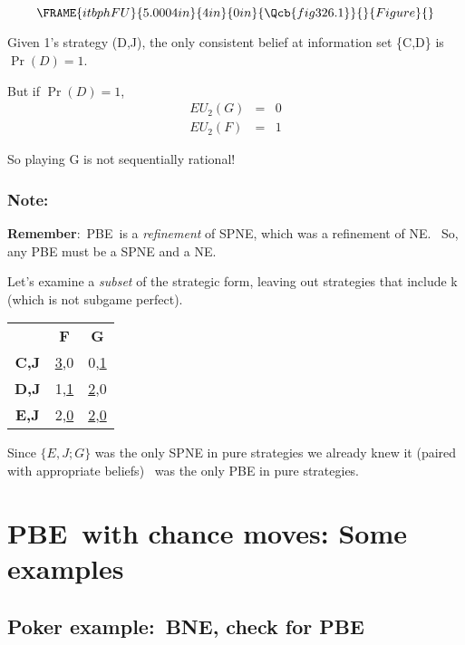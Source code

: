 \documentclass{article}
\begin{document}
\[
\FRAME{itbphFU}{5.0004in}{4in}{0in}{\Qcb{fig 326.1}}{}{Figure}{\special%
{language "Scientific Word";type "GRAPHIC";maintain-aspect-ratio
TRUE;display "USEDEF";valid_file "T";width 5.0004in;height 4in;depth
0in;original-width 5.3358in;original-height 4.6484in;cropleft "0";croptop
"1";cropright "1";cropbottom "0";tempfilename
'JSH9C621.wmf';tempfile-properties "XPR";}} 
\]

Given 1's strategy (D,J), the only consistent belief at information set
\{C,D\} is $\Pr (D)=1$.

But if $\Pr (D)=1$, 
\begin{eqnarray*}
EU_{2}(G) &=&0 \\
EU_{2}(F) &=&1
\end{eqnarray*}

So playing G is not sequentially rational!

\bigskip 

\bigskip 

\subsubsection{\textbf{Note:}}

\textbf{Remember}:\ PBE\ is a \textit{refinement }of SPNE, which was a
refinement of NE. \ So, any PBE must be a SPNE and a NE. \ 

Let's examine a \textit{subset} of the strategic form, leaving out
strategies that include k (which is not subgame perfect).

\begin{tabular}{ccc}
& \textbf{F} & \textbf{G} \\ 
\textbf{C,J} & \underline{3},0 & 0,\underline{1} \\ 
\textbf{D,J} & 1,\underline{1} & \underline{2},0 \\ 
\textbf{E,J} & 2,\underline{0} & \underline{2},\underline{0}%
\end{tabular}

Since $\{E,J;G\}$ was the only SPNE in pure strategies we already knew it
(paired with appropriate beliefs) \ was the only PBE in pure strategies.

\bigskip 

\section{PBE\ with chance moves: Some examples }

\subsection{Poker example:\ BNE, check for PBE}
\end{document}
